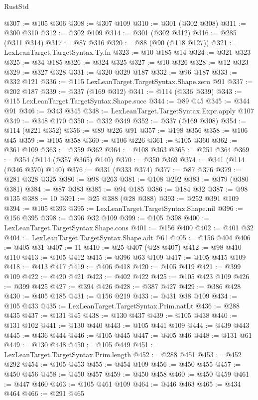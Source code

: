 \begin{lexlean}{RustStd}
\begin{coremodule}
@307 := @105 @306
@308 := @307 @109
@310 := @301 (@302 @308)
@311 := @300 @310
@312 := @302 @109
@314 := @301 (@302 @312)
@316 := @285 (@311 @314)
@317 := @87 @316
@320 := @88 (@90 (@118 @127))
@321 := LexLeanTarget.TargetSyntax.Ty.fn
@323 := @10 @185 @14
@324 := @321 @323
@325 := @34 @185
@326 := @324 @325
@327 := @10 @326
@328 := @12 @323
@329 := @327 @328
@331 := @320 @329 @187
@332 := @96 @187
@333 := @332 @121
@336 := @115 LexLeanTarget.TargetSyntax.Shape.zero @91
@337 := @202 @187
@339 := @337 (@169 @312)
@341 := @114 (@336 @339)
@343 := @115 LexLeanTarget.TargetSyntax.Shape.succ
@344 := @89 @45
@345 := @344 @91
@346 := @343 @345
@348 := LexLeanTarget.TargetSyntax.Expr.apply @107
@349 := @348 @170
@350 := @332 @349
@352 := @337 (@169 @308)
@354 := @114 (@221 @352)
@356 := @89 @226 @91
@357 := @198 @356
@358 := @106 @45
@359 := @105 @358
@360 := @106 @226
@361 := @105 @360
@362 := @361 @109
@363 := @359 @362
@364 := @108 @363
@365 := @251 @364
@369 := @354 (@114 (@357 @365) @140)
@370 := @350 @369
@374 := @341 (@114 (@346 @370) @140)
@376 := @331 (@333 @374)
@377 := @87 @376
@379 := @281 @328 @325
@380 := @98 @263
@381 := @108 @292
@383 := @379 (@380 @381)
@384 := @87 @383
@385 := @94 @185
@386 := @184 @32
@387 := @98 @135
@388 := 10
@391 := @25 @388 (@28 @388)
@393 := @252 @391 @109
@394 := @105 @393
@395 := LexLeanTarget.TargetSyntax.Shape.nil
@396 := @156 @395
@398 := @396 @32 @109
@399 := @105 @398
@400 := LexLeanTarget.TargetSyntax.Shape.cons
@401 := @156 @400
@402 := @401 @32
@404 := LexLeanTarget.TargetSyntax.Shape.adt @61
@405 := @156 @404
@406 := @405 @31
@407 := 11
@410 := @25 @407 (@28 @407)
@412 := @98 @410 @110
@413 := @105 @412
@415 := @396 @63 @109
@417 := @105 @415 @109
@418 := @413 @417
@419 := @406 @418
@420 := @105 @419
@421 := @399 @109
@422 := @420 @421
@423 := @402 @422
@425 := @105 @423 @109
@426 := @399 @425
@427 := @394 @426
@428 := @387 @427
@429 := @386 @428
@430 := @405 @185
@431 := @156 @219
@433 := @431 @38 @109
@434 := @105 @433
@435 := LexLeanTarget.TargetSyntax.Prim.natLt
@436 := @288 @435
@437 := @131 @45
@438 := @130 @437
@439 := @105 @438
@440 := @131 @102
@441 := @130 @440
@443 := @105 @441 @109
@444 := @439 @443
@445 := @436 @444
@446 := @105 @445
@447 := @405 @46
@448 := @131 @61
@449 := @130 @448
@450 := @105 @449
@451 := LexLeanTarget.TargetSyntax.Prim.length
@452 := @288 @451
@453 := @452 @292
@454 := @105 @453
@455 := @454 @109
@456 := @450 @455
@457 := @450 @456
@458 := @450 @457
@459 := @450 @458
@460 := @450 @459
@461 := @447 @460
@463 := @105 @461 @109
@464 := @446 @463
@465 := @434 @464
@466 := @291 @465

\end{coremodule}
\end{lexlean}
